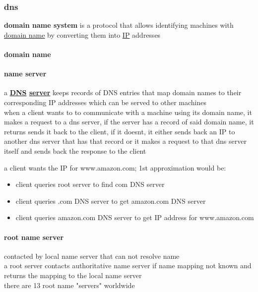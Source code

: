 \documentclass[a4paper,12pt]{article}
\begin{document}
\subsubsection{dns}
\label{sec:org15194d9}
\textbf{domain name system} is a protocol that allows identifying machines with \hyperref[sec:orga14cc92]{domain name} by converting them into \hyperref[sec:org07a120e]{IP} addresses\\
\paragraph{domain name}
\label{sec:orga14cc92}
\paragraph{name server}
\label{sec:orgc121ad0}
a \textbf{\hyperref[sec:org15194d9]{DNS} \hyperref[sec:org3528d03]{server}} keeps records of DNS entries that map domain names to their corresponding IP addresses which can be served to other machines\\
when a client wants to to communicate with a machine using its domain name, it makes a request to a dns server, if the server has a record of said domain name, it returns sends it back to the client, if it doesnt, it either sends back an IP to another dns server that has that record or it makes a request to that dns server itself and sends back the response to the client\\
\begin{center}

\end{center}

\begin{my_example}
a client wants the IP for www.amazon.com; 1st approximation would be:\\
\begin{itemize}
\item client queries root server to find com DNS server\\
\item client queries .com DNS server to get amazon.com DNS server\\
\item client queries amazon.com DNS server to get IP address for www.amazon.com\\
\end{itemize}
\end{my_example}
\paragraph{root name server}
\label{sec:org9dcee91}
contacted by local name server that can not resolve name\\
a root server contacts authoritative name server if name mapping not known and returns the mapping to the local name server\\
there are 13 root name "servers" worldwide\\
\end{document}
